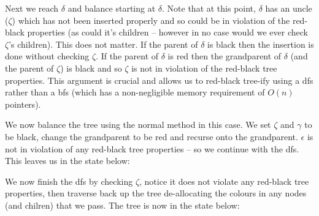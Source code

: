 \documentclass[10pt,\jkfside,a4paper]{article}
\begin{document}
\begin{enumerate}
\begin{enumerate}
Next we reach $\delta$ and balance starting at $\delta$. Note that at this point, $\delta$ has an uncle ($\zeta$) which has not been 
inserted properly and so could be in violation of the red-black properties (as could it's children -- however in no 
case would we ever check $\zeta$'s children). 
This does not matter. If the parent of $\delta$ is black then the insertion is done without checking $\zeta$. 
If the parent of $\delta$ is red then the grandparent of $\delta$ (and the parent of $\zeta$) is black and so $\zeta$ 
is not in violation of the red-black tree properties. This argument is crucial and allows us to red-black tree-ify using a dfs 
rather than a bfs (which has a non-negligible memory requirement of $O(n)$ pointers). 

We now balance the tree using the normal method in this case. We set $\zeta$ and $\gamma$ to be black, change 
the grandparent to be red and recurse onto the grandparent. $\epsilon$ is not in violation of 
any red-black tree properties -- so we continue with the dfs. This leaves us in the state below:

\begin{center}
\end{center}

We now finish the dfs by checking $\zeta$, notice it does not violate any red-black tree properties, then traverse 
back up the tree de-allocating the colours in any nodes (and chilren) that we pass. The tree is now in the state below:


\end{enumerate}
\end{enumerate}
\end{document}
